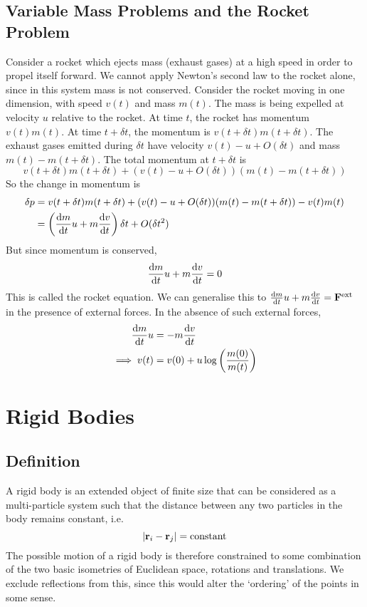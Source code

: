 \documentclass{article}
\begin{document}
\subsection{Variable Mass Problems and the Rocket Problem}
Consider a rocket which ejects mass (exhaust gases) at a high speed in order to propel itself forward. We cannot apply Newton's second law to the rocket alone, since in this system mass is not conserved. Consider the rocket moving in one dimension, with speed $v(t)$ and mass $m(t)$. The mass is being expelled at velocity $u$ relative to the rocket. At time $t$, the rocket has momentum $v(t) m(t)$. At time $t + \delta t$, the momentum is $v(t + \delta t) m(t + \delta t)$. The exhaust gases emitted during $\delta t$ have velocity $v(t) - u + O(\delta t)$ and mass $m(t) - m(t + \delta t)$. The total momentum at $t + \delta t$ is
\[ v(t + \delta t) m(t + \delta t) + (v(t) - u + O(\delta t))(m(t) - m(t + \delta t)) \]
So the change in momentum is
\begin{align*}
	\delta p & = v(t + \delta t) m(t + \delta t) + (v(t) - u + O(\delta t))(m(t) - m(t + \delta t)) - v(t) m(t) \\
	         & = \left( \dv{m}{t} u + m \dv{v}{t} \right) \delta t + O(\delta t^2)                              \\
\end{align*}
But since momentum is conserved,
\[ \dv{m}{t} u + m \dv{v}{t} = 0 \]
This is called the rocket equation. We can generalise this to $\dv{m}{t} u + m \dv{v}{t} = \vb F^\text{ext}$ in the presence of external forces. In the absence of such external forces,
\begin{align*}
	\dv{m}{t} u   & = - m \dv{v}{t}                                  \\
	\implies v(t) & = v(0) + u \log \left( \frac{m(0)}{m(t)} \right)
\end{align*}

\section{Rigid Bodies}
\subsection{Definition}
A rigid body is an extended object of finite size that can be considered as a multi-particle system such that the distance between any two particles in the body remains constant, i.e.
\[ \abs{\vb r_i - \vb r_j} = \text{constant} \]
The possible motion of a rigid body is therefore constrained to some combination of the two basic isometries of Euclidean space, rotations and translations. We exclude reflections from this, since this would alter the `ordering' of the points in some sense.
\end{document}
